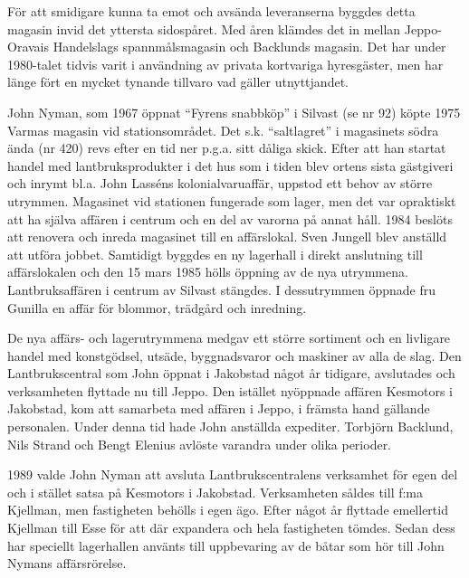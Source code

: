 För att smidigare kunna ta emot och avsända leveranserna byggdes detta magasin invid det yttersta sidospåret. Med åren klämdes det in mellan Jeppo-Oravais Handelslags spannmålsmagasin och Backlunds magasin. Det har under 1980-talet tidvis varit i användning av privata kortvariga hyresgäster, men har länge fört en mycket tynande tillvaro vad gäller utnyttjandet.





John Nyman, som 1967 öppnat ``Fyrens snabbköp'' i Silvast (se nr 92) köpte 1975 Varmas magasin vid stationsområdet. Det s.k. ``saltlagret'' i magasinets södra ända (nr 420) revs efter en tid ner p.g.a. sitt dåliga skick. Efter att han startat handel med lantbruksprodukter i det hus som i tiden blev ortens sista gästgiveri och inrymt bl.a. John Lasséns kolonialvaruaffär, uppstod ett behov av större utrymmen. Magasinet vid stationen fungerade som lager, men det var opraktiskt att ha själva affären i centrum och en del av varorna på annat håll. 1984 beslöts att renovera  och inreda magasinet till en affärslokal. Sven Jungell blev anställd att utföra jobbet. Samtidigt byggdes en ny lagerhall i direkt anslutning till affärslokalen och den 15 mars 1985 hölls öppning av de nya utrymmena. Lantbruksaffären i centrum av Silvast stängdes. I dessutrymmen öppnade fru Gunilla en affär för blommor, trädgård och inredning.

De nya affärs- och lagerutrymmena medgav ett större sortiment och en livligare handel med konstgödsel, utsäde, byggnadsvaror och maskiner av alla de slag. Den Lantbrukscentral som John öppnat i Jakobstad något år tidigare, avslutades och verksamheten flyttade nu till Jeppo. Den istället nyöppnade affären Kesmotors i Jakobstad, kom att samarbeta med affären i Jeppo, i främsta hand gällande personalen. Under denna tid hade John anställda expediter. Torbjörn Backlund, Nils Strand och Bengt Elenius avlöste varandra under olika perioder.

1989 valde John Nyman att avsluta Lantbrukscentralens verksamhet för egen del och i stället satsa på Kesmotors i Jakobstad. Verksamheten såldes till f:ma Kjellman, men fastigheten behölls i egen ägo. Efter något år flyttade emellertid Kjellman till Esse för att där expandera  och hela fastigheten tömdes. Sedan dess har speciellt lagerhallen använts till uppbevaring av de båtar som hör till John Nymans affärsrörelse.


